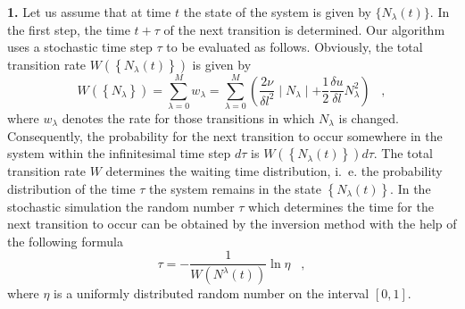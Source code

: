 {\bf{1.}} Let us assume that at time $t$ the state of the system is given
by $\{ N_{\lambda}(t) \}$. In the first step, the time $t+\tau$ of the
next transition is determined. Our algorithm uses a stochastic time step
$\tau$ to be evaluated as follows.
Obviously, the total transition rate
$W(\left\{ N_{\lambda}(t) \right\}) $ is  given by
\begin{equation}
W(\left\{ N_{\lambda} \right\}) =
\sum_{\lambda =0}^{M} w_{\lambda} =
\sum_{\lambda =0}^M \left(
\frac{2 \nu}{\delta l^2}
\mid N_{\lambda} \mid
+ \frac{1}{2} \frac{\delta u}{\delta l} 
N_{\lambda}^2  \right) \;\;\; ,
\end{equation}
where $w_{\lambda}$ denotes the rate for those transitions in which
$N_{\lambda}$ is changed.
Consequently, the probability 
for the next transition to occur somewhere in the system
within the infinitesimal time step $d\tau$ is
$W(\left\{ N_{\lambda}(t) \right\}) d\tau$.
The total transition rate $W$ determines the waiting time distribution,
i.~e. the probability distribution of the time $\tau$ the system remains in the
state $\left\{N_{\lambda}(t)\right\}$. In the stochastic simulation
the random number $\tau$ which determines the time for the
next transition to occur can be obtained by the inversion method
with the help of the following formula
\begin{equation}
\tau = - \frac{1}{W(N^{\lambda}(t))} \ln \eta \;\;\; ,
\end{equation}
where $\eta$ is a uniformly distributed random number on the interval
$[0,1]$.

